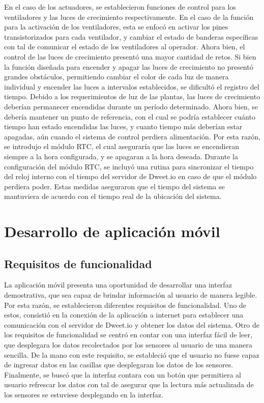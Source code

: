 En el caso de los actuadores, se establecieron funciones de control para los ventiladores y las luces de crecimiento respectivamente. En el caso de la función para la activación de los ventiladores, esta se enfocó en activar los pines transistorizados para cada ventilador, y cambiar el estado de banderas específicas con tal de comunicar el estado de los ventiladores al operador. Ahora bien, el control de las luces de crecimiento presentó una mayor cantidad de retos. Si bien la función diseñada para encender y apagar las luces de crecimiento no presentó grandes obstáculos, permitiendo cambiar el color de cada luz de manera individual y encender las luces a intervalos establecidos, se dificultó el registro del tiempo. Debido a los requerimientos de luz de las plantas, las luces de crecimiento deberían permanecer encendidas durante un período determinado. Ahora bien, se debería mantener un punto de referencia, con el cual se podría establecer cuánto tiempo han estado encendidas las luces, y cuanto tiempo más deberían estar apagadas, aún cuando el sistema de control perdiera alimentación. Por esta razón, se introdujo el módulo RTC, el cual aseguraría que las luces se encendieran siempre a la hora configurada, y se apagaran a la hora deseada. Durante la configuración del módulo RTC, se incluyó una rutina para sincronizar el tiempo del reloj interno con el tiempo del servidor de Dweet.io en caso de que el módulo perdiera poder. Estas medidas aseguraron que el tiempo del sistema se mantuviera de acuerdo con el tiempo real de la ubicación del sistema.


\chapter{Desarrollo de aplicación móvil}

\section{Requisitos de funcionalidad}

La aplicación móvil presenta una oportunidad de desarrollar una interfaz demostrativa, que sea capaz de brindar información al usuario de manera legible. Por esta razón, se establecieron diferentes requisitos de funcionalidad. Uno de estos, consistió en la conexión de la aplicación a internet para establecer una comunicación con el servidor de Dweet.io y obtener los datos del sistema. Otro de los requisitos de funcionalidad se centró en contar con una interfaz fácil de leer, que desplegara los datos recolectados por los sensores al usuario de una manera sencilla. De la mano con este requisito, se estableció que el usuario no fuese capaz de ingresar datos en las casillas que desplegaran los datos de los sensores. Finalmente, se buscó que la interfaz contara con un botón que permitiera al usuario refrescar los datos con tal de asegurar que la lectura más actualizada de los sensores se estuviese desplegando en la interfaz. 


